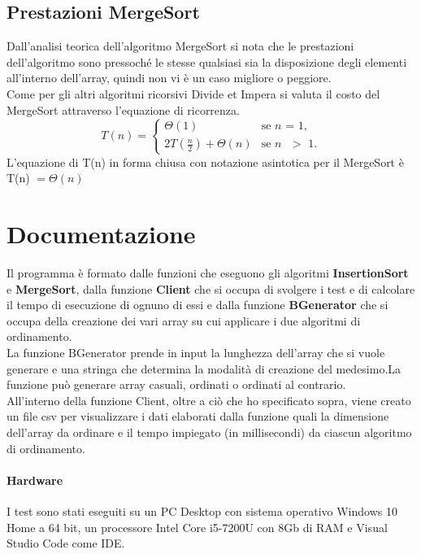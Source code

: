 \documentclass[12pt]{article}
\begin{document}
\subsection{Prestazioni MergeSort}
Dall'analisi teorica dell'algoritmo MergeSort si nota che le prestazioni dell'algoritmo sono pressoché le stesse qualsiasi sia la disposizione degli elementi all'interno dell'array, quindi non vi è un caso migliore o peggiore.
\\Come per gli altri algoritmi ricorsivi Divide et Impera si valuta il costo del MergeSort attraverso l'equazione di ricorrenza.
\begin{equation*}
T(n) = \begin{cases}
\Theta(1) & \text{se $n$ = 1,}\\
2T(\frac{n}{2}) + \Theta(n) & \text{se $n$ $>$ 1.}
\end{cases}
\end{equation*}
L'equazione di T(n) in forma chiusa con notazione asintotica per il MergeSort è T(n) $= \Theta(n)$


\section{Documentazione}

Il programma è formato dalle funzioni che eseguono gli algoritmi \textbf{InsertionSort} e \textbf{MergeSort}, dalla funzione \textbf{Client} che si occupa di svolgere i test e di calcolare il tempo di esecuzione di ognuno di essi e dalla funzione \textbf{BGenerator} che si occupa della creazione dei vari array su cui applicare i due algoritmi di ordinamento.
\\La funzione BGenerator prende in input la lunghezza dell'array che si vuole generare e una stringa che determina la modalità di creazione del medesimo.La funzione può generare array casuali, ordinati o ordinati al contrario.
\\All'interno della funzione Client, oltre a ciò che ho specificato sopra, viene creato un file csv per visualizzare i dati elaborati dalla funzione quali la dimensione dell'array da ordinare e il tempo impiegato (in millisecondi) da ciascun algoritmo di ordinamento.







\paragraph{Hardware}
I test sono stati eseguiti su un PC Desktop con sistema operativo Windows 10 Home a 64 bit, un processore Intel Core i5-7200U con 8Gb di RAM e Visual Studio Code come IDE.
 
\end{document}
